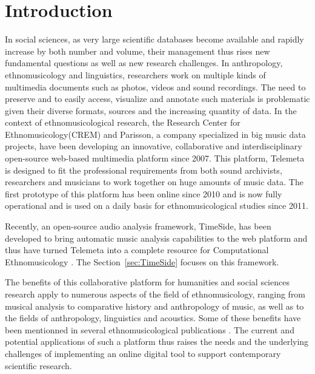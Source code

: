 \documentclass{sig-alternate}
\newcommand{\CREM}{Research Center for Ethnomusicology}
\begin{document}
\section{Introduction}\label{sec:intro}
In social sciences, as very large scientific databases become available and rapidly increase by both number and volume, their management thus rises new fundamental questions as well as new research challenges. 
In anthropology, ethnomusicology and linguistics, researchers work on multiple kinds of multimedia documents such as photos, videos and sound recordings. The need to preserve and to easily access, visualize and annotate such materials is problematic given their diverse formats, sources and the increasing quantity of data.
 In the context of ethnomusicological research, the \CREM (CREM) and Parisson, a company specialized in big music data projects, have been developing an innovative, collaborative and interdisciplinary open-source web-based multimedia platform since 2007. 
 This platform, Telemeta is designed to fit the professional requirements from both sound archivists, researchers and musicians to work together on huge amounts of music data. The first prototype of this platform has been online since 2010 and is now fully operational and is used on a daily basis for ethnomusicological studies since 2011. 

Recently, an open-source audio analysis framework, TimeSide, has been developed to bring automatic music analysis capabilities to the web platform and thus have turned Telemeta into a complete resource for Computational Ethnomusicology \cite{Tzanetakis_2007_JIMS, Gomez_JNMR_2013}. The Section~\ref{sec:TimeSide} focuses on this framework.

The benefits of this collaborative platform for humanities and social sciences research apply to numerous aspects of the field of ethnomusicology, ranging from musical analysis to comparative history and anthropology of music, as well as to the fields of anthropology, linguistics and acoustics. Some of these benefits have been mentionned in several ethnomusicological publications \cite{Simmonot_IASA_2011, Julien_IASA_2011, Simonnot_ICTM_2014}.
The current and potential applications of such a platform thus raises the needs and the underlying challenges of implementing an online digital tool to support contemporary scientific research.
\end{document}
